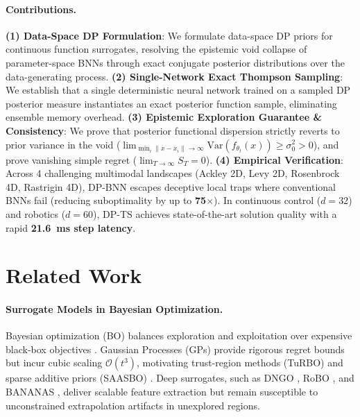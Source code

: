 \documentclass{article}
\begin{document}
\paragraph{Contributions.}
\textbf{(1) Data-Space DP Formulation}: We formulate data-space DP priors for continuous function surrogates, resolving the epistemic void collapse of parameter-space BNNs through exact conjugate posterior distributions over the data-generating process.
\textbf{(2) Single-Network Exact Thompson Sampling}: We establish that a single deterministic neural network trained on a sampled DP posterior measure instantiates an exact posterior function sample, eliminating ensemble memory overhead.
\textbf{(3) Epistemic Exploration Guarantee \& Consistency}: We prove that posterior functional dispersion strictly reverts to prior variance in the void ($\lim_{\min_i \|x - x_i\| \to \infty} \mathrm{Var}(f_{\theta_t}(x)) \ge \sigma_0^2 > 0$), and prove vanishing simple regret ($\lim_{T \to \infty} S_T = 0$).
\textbf{(4) Empirical Verification}: Across 4 challenging multimodal landscapes (Ackley 2D, Levy 2D, Rosenbrock 4D, Rastrigin 4D), DP-BNN escapes deceptive local traps where conventional BNNs fail (reducing suboptimality by up to \textbf{75$\times$}). In continuous control ($d=32$) and robotics ($d=60$), DP-TS achieves state-of-the-art solution quality with a rapid \textbf{21.6~ms step latency}.

\section{Related Work}
\label{sec:related}
\paragraph{Surrogate Models in Bayesian Optimization.}
Bayesian optimization (BO) balances exploration and exploitation over expensive black-box objectives \citep{mockus1975bayesian,brochu2010tutorial}. Gaussian Processes (GPs) provide rigorous regret bounds \citep{srinivas2010gaussian} but incur cubic scaling $\mathcal{O}(t^3)$, motivating trust-region methods (TuRBO) \citep{eriksson2019scalable} and sparse additive priors (SAASBO) \citep{eriksson2021high}. Deep surrogates, such as DNGO \citep{snoek2015scalable}, RoBO \citep{springenberg2016bayesian}, and BANANAS \citep{white2021bananas}, deliver scalable feature extraction but remain susceptible to unconstrained extrapolation artifacts in unexplored regions.
\end{document}
